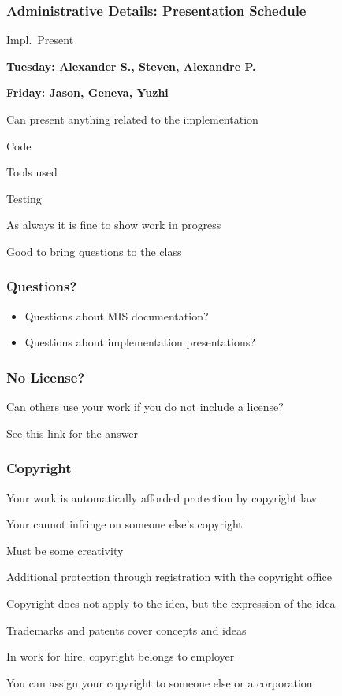 \documentclass[t,12pt,numbers,fleqn]{beamer}
\begin{document}
\begin{frame}
\frametitle{Administrative Details: Presentation Schedule}

\bi
\item {Impl.\ Present}
\bi
\item \textbf{Tuesday: Alexander S., Steven, Alexandre P.}
\item \textbf{Friday: Jason, Geneva, Yuzhi}
\ei
\item Can present anything related to the implementation
\bi
\item Code
\item Tools used
\item Testing
\item As always it is fine to show work in progress
\item Good to bring questions to the class
\ei
\ei

\end{frame}


\begin{frame}
\frametitle{Questions?}
\begin{itemize}
\item Questions about MIS documentation?
\item Questions about implementation presentations?
\end{itemize}
\end{frame}


\begin{frame}
\frametitle{No License?}

\bi
\item Can others use your work if you do not include a license?
\item \href{http://choosealicense.com/no-license/}{See this link for the answer}
\ei

\end{frame}


\begin{frame}
\frametitle{Copyright}

\bi
\item Your work is automatically afforded protection by copyright law
\bi
\item Your cannot infringe on someone else's copyright
\item Must be some creativity
\ei
\item Additional protection through registration with the copyright office
\item Copyright does not apply to the idea, but the expression of the idea
\item Trademarks and patents cover concepts and ideas
\item In work for hire, copyright belongs to employer
\item You can assign your copyright to someone else or a corporation
\ei

\end{frame}
\end{document}
